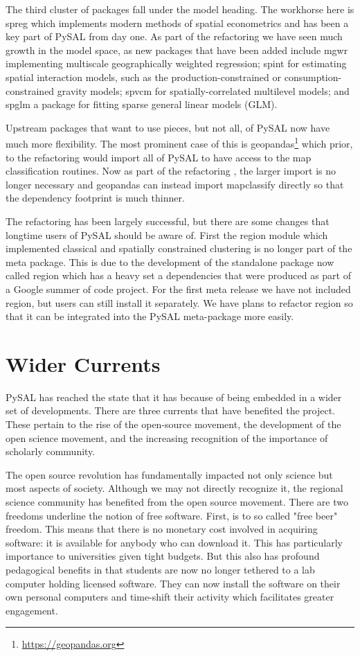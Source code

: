 \documentclass[11pt]{article}
\begin{document}
The third cluster of packages fall under the model heading. The workhorse here
is spreg which implements modern methods of spatial econometrics and has been a
key part of PySAL from day one. As part of the refactoring we have seen much
growth in the model space, as new packages that have been added include mgwr
implementing multiscale geographically weighted regression; spint for
estimating spatial interaction models, such as the production-constrained or
consumption-constrained gravity models;  spvcm for spatially-correlated
multilevel models; and spglm a package for fitting sparse general linear models
(GLM).


Upstream packages that want to use pieces, but not all, of PySAL now have much
more flexibility. The most prominent case of this is geopandas\footnote{\url{https://geopandas.org}}
which prior, to the refactoring would import all of PySAL to have access to
the map classification routines. Now as part of the refactoring , the larger
import is no longer necessary and geopandas can instead import mapclassify
directly so that the dependency footprint is much thinner.


The refactoring has been largely successful, but there are some changes that
longtime users of PySAL should be aware of. First the region module which
implemented classical and spatially constrained clustering is no longer part of
the meta package. This is due to the development of the standalone package now
called region which has a heavy set a dependencies that were produced as part
of a Google summer of code project. For the first meta release we have not
included region, but users can still install it separately. We have plans to
refactor region so that it can be integrated into the PySAL meta-package more
easily.

\section{Wider Currents}
\label{sec:org701c4d3}
PySAL has reached the state that it has because of being embedded in a wider set
of developments. There are three currents that have benefited the project. These
pertain to the rise of the open-source movement, the development of the open
science movement, and the increasing recognition of the importance of scholarly
community.

The open source revolution has fundamentally impacted not only science but most
aspects of society. Although we may not directly recognize it, the regional
science community has benefited from the open source movement. There are two
freedoms underline the notion of free software. First, is to so called "free
beer" freedom. This means that there is no monetary cost involved in acquiring
software: it is available for anybody who can download it. This has
particularly importance to universities given tight budgets. But this also has
profound pedagogical benefits in that students are now no longer tethered to a
lab computer holding licensed software. They can now install the software on
their own personal computers and time-shift their activity which facilitates
greater engagement.
\end{document}
